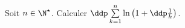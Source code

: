 \begin{exercice}
Soit $n\in\N^{\star}$. Calculer $\ddp \sum\limits_{k=1}^n \ln{\left( 1+\ddp\frac{1}{k}  \right)}$.
\end{exercice}
